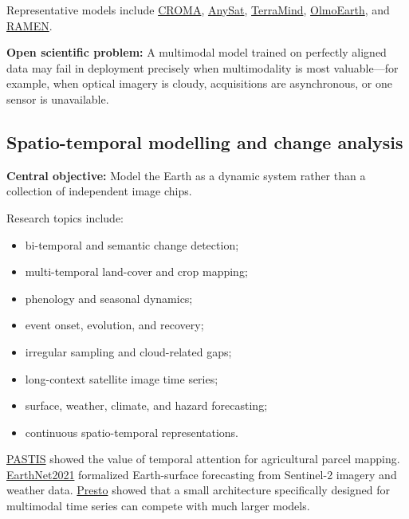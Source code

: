 \documentclass[
  a4paper,
  11pt]{article}
\providecommand{\tightlist}{%
  \setlength{\itemsep}{0pt}\setlength{\parskip}{0pt}}
\begin{document}
Representative models include
\href{https://arxiv.org/abs/2311.00566}{CROMA},
\href{https://arxiv.org/abs/2412.14123}{AnySat},
\href{https://arxiv.org/html/2504.11171v5}{TerraMind},
\href{https://arxiv.org/abs/2511.13655}{OlmoEarth}, and
\href{https://arxiv.org/abs/2512.05025}{RAMEN}.

\textbf{Open scientific problem:} A multimodal model trained on
perfectly aligned data may fail in deployment precisely when
multimodality is most valuable---for example, when optical imagery is
cloudy, acquisitions are asynchronous, or one sensor is unavailable.

\hypertarget{spatio-temporal-modelling-and-change-analysis}{%
\subsection{Spatio-temporal modelling and change
analysis}\label{spatio-temporal-modelling-and-change-analysis}}

\textbf{Central objective:} Model the Earth as a dynamic system rather
than a collection of independent image chips.

Research topics include:

\begin{itemize}
\tightlist
\item
  bi-temporal and semantic change detection;
\item
  multi-temporal land-cover and crop mapping;
\item
  phenology and seasonal dynamics;
\item
  event onset, evolution, and recovery;
\item
  irregular sampling and cloud-related gaps;
\item
  long-context satellite image time series;
\item
  surface, weather, climate, and hazard forecasting;
\item
  continuous spatio-temporal representations.
\end{itemize}

\href{https://arxiv.org/abs/2107.07933}{PASTIS} showed the value of
temporal attention for agricultural parcel mapping.
\href{https://openaccess.thecvf.com/content/CVPR2021W/EarthVision/papers/Requena-Mesa_EarthNet2021_A_Large-Scale_Dataset_and_Challenge_for_Earth_Surface_Forecasting_CVPRW_2021_paper.pdf}{EarthNet2021}
formalized Earth-surface forecasting from Sentinel-2 imagery and weather
data. \href{https://arxiv.org/abs/2304.14065}{Presto} showed that a
small architecture specifically designed for multimodal time series can
compete with much larger models.
\end{document}
